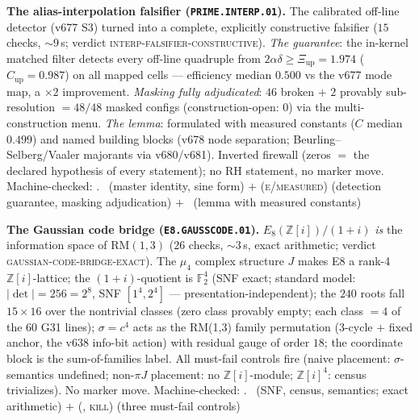\documentclass[11pt,a4paper]{article}
\theoremstyle{definition}
\begin{document}
\par\smallskip\noindent\textbf{The alias-interpolation falsifier
(\texttt{PRIME.INTERP.01}).}
The calibrated off-line detector (v677 S3) turned into a complete,
explicitly constructive falsifier ($15$ checks, ${\sim}9$\,s;
verdict \textsc{interp-falsifier-constructive}).  \emph{The
guarantee}: the in-kernel matched filter detects every off-line
quadruple from $2\alpha\delta\ge\Xi_{\mathrm{up}}=1.974$
($C_{\mathrm{up}}=0.987$) on all mapped cells --- efficiency median
$0.500$ vs the v677 mode map, a $\times2$ improvement.
\emph{Masking fully adjudicated}: $46$ broken $+$ $2$ provably
sub-resolution $=48/48$ masked configs (construction-open: $0$) via
the multi-construction menu.  \emph{The lemma}: formulated with
measured constants ($C$ median $0.499$) and named building blocks
(v678 node separation; Beurling--Selberg/Vaaler majorants via
v680/v681).  Inverted firewall (zeros $=$ the declared hypothesis of
every statement); no RH statement, no marker move.
Machine-checked: .
\mE\ (master identity, sine form) $+$ (\textsc{e/measured})
(detection guarantee, masking adjudication) $+$ \mC\ (lemma with
measured constants)
\par\smallskip

\par\smallskip\noindent\textbf{The Gaussian code bridge
(\texttt{E8.GAUSSCODE.01}).}
$E_8(\mathbb{Z}[i])/(1+i)$ \emph{is} the information space of
$\mathrm{RM}(1,3)$ ($26$ checks, ${\sim}3$\,s, exact arithmetic;
verdict \textsc{gaussian-code-bridge-exact}).  The $\mu_4$ complex
structure $J$ makes E8 a rank-4 $\mathbb{Z}[i]$-lattice; the
$(1+i)$-quotient is $\mathbb{F}_2^4$ (SNF exact; standard model:
$|\det|=256=2^8$, SNF $[1^4,2^4]$ --- presentation-independent);
the $240$ roots fall $15\times16$ over the nontrivial classes (zero
class provably empty; each class $=4$ of the $60$ G31 lines);
$\sigma=c^4$ acts as the RM(1,3) family permutation (3-cycle $+$
fixed anchor, the v638 info-bit action) with residual gauge of order
$18$; the coordinate block is the sum-of-families label.  All
must-fail controls fire (naive placement: $\sigma$-semantics
undefined; non-$\pi J$ placement: no $\mathbb{Z}[i]$-module;
$\mathbb{Z}[i]^4$: census trivializes).  No marker move.
Machine-checked: .
\mE\ (SNF, census, semantics; exact arithmetic) $+$ (\mE,
\textsc{kill}) (three must-fail controls)
\par\smallskip
\end{document}
